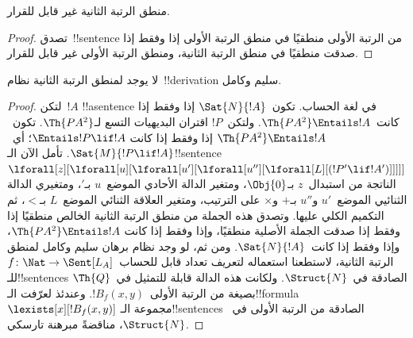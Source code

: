 \documentclass[../../../include/open-logic-section]{subfiles}
\begin{document}


\begin{thm}
منطق الرتبة الثانية غير قابل للقرار.
\end{thm}

\begin{proof}
تصدق~!!{sentence} من الرتبة الأولى منطقيًا في منطق الرتبة الأولى إذا
وفقط إذا صدقت منطقيًا في منطق الرتبة الثانية، ومنطق الرتبة الأولى غير
قابل للقرار.
\end{proof}

\begin{thm}
لا يوجد لمنطق الرتبة الثانية نظام~!!{derivation} سليم وكامل.
\end{thm}

\begin{proof}
لتكن~$!A$ !!a{sentence} في لغة الحساب. تكون~$\Sat{N}{!A}$ إذا وفقط
إذا كانت~$\Th{PA^2} \Entails !A$. ولتكن~$!P$ اقتران البديهيات التسع
لـ$\Th{PA^2}$. تكون~$\Th{PA^2} \Entails !A$ إذا وفقط إذا كانت
$\Entails !P \lif !A$؛ أي~$\Sat{M}{!P \lif !A}$. تأمل الآن
الـ!!{sentence}
$\lforall[z][\lforall[u][\lforall[u'][\lforall[u''][\lforall[L][(!P' \lif !A')]]]]]$
الناتجة من استبدال~$z$ بـ$\Obj{0}$، ومتغير الدالة الأحادي الموضع~$u$
بـ$\prime$، ومتغيري الدالة الثنائيي الموضع~$u'$ و$u''$ بـ$+$ و$\times$
على الترتيب، ومتغير العلاقة الثنائي الموضع~$L$ بـ$<$، ثم التكميم الكلي
عليها. وتصدق هذه الجملة من منطق الرتبة الثانية الخالص منطقيًا إذا وفقط
إذا صدقت الجملة الأصلية منطقيًا، وإذا وفقط إذا كانت
$\Th{PA^2} \Entails !A$، وإذا وفقط إذا كانت~$\Sat{N}{!A}$. ومن ثم، لو
وجد نظام برهان سليم وكامل لمنطق الرتبة الثانية، لاستطعنا استعماله
لتعريف تعداد قابل للحساب~$f\colon \Nat \to \Sent[L_A]$
للـ!!{sentence}s الصادقة في~$\Struct{N}$. ولكانت هذه الدالة قابلة
للتمثيل في~$\Th{Q}$ بصيغة من الرتبة الأولى~$!B_f(x, y)$. وعندئذ
لعرّفت الـ!!{formula}~$\lexists[x][!B_f(x, y)]$ مجموعة
الـ!!{sentence}s الصادقة من الرتبة الأولى في~$\Struct{N}$، مناقضةً
مبرهنة تارسكي.
\end{proof}
\end{document}

